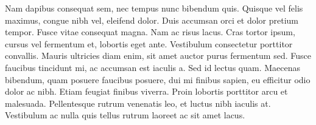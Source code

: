 \documentclass{jamk-report}
\begin{document}
Nam dapibus consequat sem, nec tempus nunc bibendum quis. Quisque
vel felis maximus, congue nibh vel, eleifend dolor. Duis accumsan
orci et dolor pretium tempor. Fusce vitae consequat magna. Nam ac
risus lacus. Cras tortor ipsum, cursus vel fermentum et, lobortis
eget ante. Vestibulum consectetur porttitor convallis. Mauris
ultricies diam enim, sit amet auctor purus fermentum sed. Fusce
faucibus tincidunt mi, ac accumsan est iaculis a. Sed id lectus
quam. Maecenas bibendum, quam posuere faucibus posuere, dui mi
finibus sapien, eu efficitur odio dolor ac nibh. Etiam feugiat
finibus viverra. Proin lobortis porttitor arcu et malesuada.
Pellentesque rutrum venenatis leo, et luctus nibh iaculis at.
Vestibulum ac nulla quis tellus rutrum laoreet ac sit amet lacus.
\end{document}
